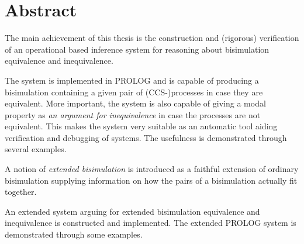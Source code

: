 
\chapter*{Abstract}
\noindent
The main achievement of this thesis is the construction and (rigorous) verification of an operational based inference system for reasoning about bisimulation equivalence and inequivalence.

The system is implemented in PROLOG and is capable of producing a bisimulation containing a given pair of (CCS-)processes in case they are equivalent. More important, the system is also capable of giving a modal property as {\em an argument for inequivalence\/} in case the processes are not equivalent.
This makes the system very suitable as an automatic tool aiding verification and debugging of systems. The usefulness is demonstrated through several examples.

A notion of {\em extended bisimulation\/} is introduced as a faithful extension of ordinary bisimulation supplying information on how the pairs of a bisimulation actually fit together.

An extended system arguing for extended bisimulation equivalence and inequivalence is constructed and implemented. The extended PROLOG system is demonstrated through some examples.


